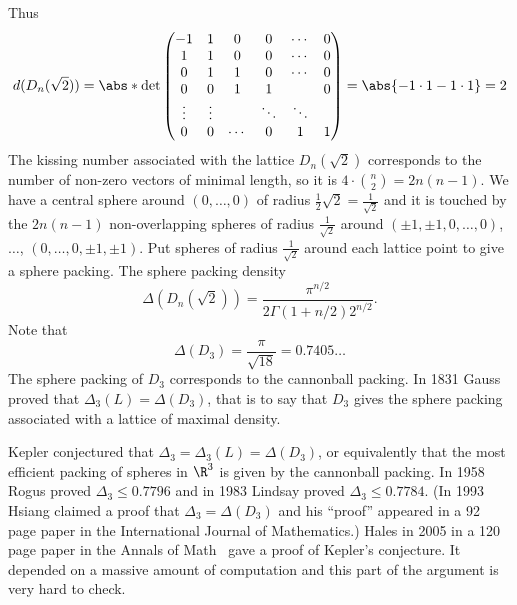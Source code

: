 Thus
\[ d(D_n(\sqrt2)) = \abs*{\det\begin{pmatrix}
-1 & 1 & 0 & 0 & \cdots & 0 \\
1 & 1 & 0 & 0 & \cdots & 0 \\
0 & 1 & 1 & 0 & \cdots & 0 \\
0 & 0 & 1 & 1 & & 0 \\
\vdots & \vdots & & \ddots & \ddots & \\
0 & 0 & \cdots & 0 & 1 & 1
\end{pmatrix}} = \abs{-1\cdot1-1\cdot1} = 2 \]
The kissing number associated with the lattice $D_n(\sqrt2)$ corresponds to the number of non-zero vectors of minimal length, so it is %
$4\cdot\binom{n}{2}=2n(n-1)$.  We have a central sphere 
around $(0,\dotsc,0)$ of radius $\frac12\sqrt2=\frac{1}{\sqrt2}$ and it is touched by the $2n(n-1)$ non-overlapping spheres of radius $\frac{1}{\sqrt2}$ around $(\pm1,\pm1,0,\dotsc,0)$, $\dotsc$, $(0,\dotsc,0,\pm1,\pm1)$.  Put spheres of radius $\frac{1}{\sqrt2}$ around each lattice point to give a sphere packing.  The sphere packing density
\[ \Delta(D_n(\sqrt2)) = \frac{\pi^{n/2}}{2\Gamma(1+n/2)2^{n/2}} . \]
Note that
\[ \Delta(D_3) = \frac{\pi}{\sqrt{18}} = 0.7405\ldots \]
The sphere packing of $D_3$ corresponds to the cannonball packing.  In 1831 Gauss proved that $\Delta_3(L)=\Delta(D_3)$, that is to say that $D_3$ gives the sphere packing associated with a lattice of maximal density.

Kepler conjectured that $\Delta_3=\Delta_3(L)=\Delta(D_3)$, or equivalently that the most efficient packing of spheres in $\R^3$ is given by the cannonball packing.  In 1958 Rogus proved $\Delta_3\leq0.7796$ and in 1983 Lindsay proved $\Delta_3\leq0.7784$.  (In 1993 Hsiang claimed a proof that $\Delta_3=\Delta(D_3)$ and his ``proof'' appeared in a 92 page paper in the International Journal of Mathematics.)  Hales in 2005 in a 120 page paper in the Annals of Math%
\ gave a proof of Kepler's conjecture.  It depended on a massive amount of computation and this part of the argument is very hard to check.

